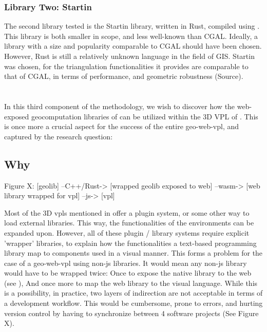 \subsubsection*{Library Two: Startin}
The second library tested is the Startin library, written in Rust, compiled using .  
This library is both smaller in scope, and less well-known than CGAL. 
Ideally, a library with a size and popularity comparable to CGAL should have been chosen.
However, Rust is still a relatively unknown language in the field of GIS. 
Startin was chosen, for the triangulation functionalities it provides are comparable to that of CGAL, in terms of performance, and geometric robustness (Source). 


\section{\mySubRQThreeTitle} 
\label{sec:method-three}
In this third component of the methodology, we wish to discover how the web-exposed geocomputation libraries of  can be utilized within the 3D VPL of . 
This is once more a crucial aspect for the success of the entire \ac*{geo-web-vpl}, 
and captured by the research question: \mySubRQThree


\subsection*{Why}

\begin{note}
Figure X: [geolib] --C++/Rust-> [wrapped geolib exposed to web] --wasm-> [web library wrapped for vpl] --js-> [vpl]
\end{note}

Most of the 3D vpls mentioned in  offer a plugin system, or some other way to load external libraries.
This way, the functionalities of the environments can be expanded upon.
However, all of these plugin / library systems require explicit 'wrapper' libraries, to explain how the functionalities a text-based programming library map to components used in a visual manner.
This forms a problem for the case of a \ac{geo-web-vpl} using non-js libraries. 
It would mean any non-js library would have to be wrapped twice: 
Once to expose the native library to the web (see ),
And once more to map the web library to the visual language. 
While this is a possibility, in practice, two layers of indirection are not acceptable in terms of a development workflow.
This would be cumbersome, prone to errors, and hurting version control by having to synchronize between 4 software projects (See Figure X). 

